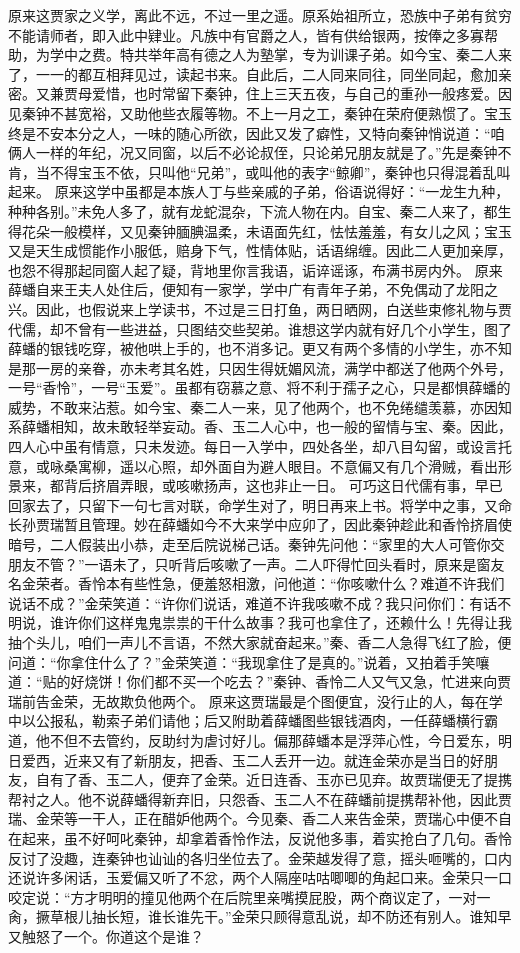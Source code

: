 \documentclass[12pt,oneside]{book}
\begin{document}
原来这贾家之义学，离此不远，不过一里之遥。原系始祖所立，恐族中子弟有贫穷不能请师者，即入此中肄业。凡族中有官爵之人，皆有供给银两，按俸之多寡帮助，为学中之费。特共举年高有德之人为塾掌，专为训课子弟。如今宝、秦二人来了，一一的都互相拜见过，读起书来。自此后，二人同来同往，同坐同起，愈加亲密。又兼贾母爱惜，也时常留下秦钟，住上三天五夜，与自己的重孙一般疼爱。因见秦钟不甚宽裕，又助他些衣履等物。不上一月之工，秦钟在荣府便熟惯了。宝玉终是不安本分之人，一味的随心所欲，因此又发了癖性，又特向秦钟悄说道：“咱俩人一样的年纪，况又同窗，以后不必论叔侄，只论弟兄朋友就是了。”先是秦钟不肯，当不得宝玉不依，只叫他“兄弟”，或叫他的表字“鲸卿”，秦钟也只得混着乱叫起来。
原来这学中虽都是本族人丁与些亲戚的子弟，俗语说得好：“一龙生九种，种种各别。”未免人多了，就有龙蛇混杂，下流人物在内。自宝、秦二人来了，都生得花朵一般模样，又见秦钟腼腆温柔，未语面先红，怯怯羞羞，有女儿之风；宝玉又是天生成惯能作小服低，赔身下气，性情体贴，话语绵缠。因此二人更加亲厚，也怨不得那起同窗人起了疑，背地里你言我语，诟谇谣诼，布满书房内外。
原来薛蟠自来王夫人处住后，便知有一家学，学中广有青年子弟，不免偶动了龙阳之兴。因此，也假说来上学读书，不过是三日打鱼，两日晒网，白送些束修礼物与贾代儒，却不曾有一些进益，只图结交些契弟。谁想这学内就有好几个小学生，图了薛蟠的银钱吃穿，被他哄上手的，也不消多记。更又有两个多情的小学生，亦不知是那一房的亲眷，亦未考其名姓，只因生得妩媚风流，满学中都送了他两个外号，一号“香怜”，一号“玉爱”。虽都有窃慕之意、将不利于孺子之心，只是都惧薛蟠的威势，不敢来沾惹。如今宝、秦二人一来，见了他两个，也不免绻缱羡慕，亦因知系薛蟠相知，故未敢轻举妄动。香、玉二人心中，也一般的留情与宝、秦。因此，四人心中虽有情意，只未发迹。每日一入学中，四处各坐，却八目勾留，或设言托意，或咏桑寓柳，遥以心照，却外面自为避人眼目。不意偏又有几个滑贼，看出形景来，都背后挤眉弄眼，或咳嗽扬声，这也非止一日。
可巧这日代儒有事，早已回家去了，只留下一句七言对联，命学生对了，明日再来上书。将学中之事，又命长孙贾瑞暂且管理。妙在薛蟠如今不大来学中应卯了，因此秦钟趁此和香怜挤眉使暗号，二人假装出小恭，走至后院说梯己话。秦钟先问他：“家里的大人可管你交朋友不管？”一语未了，只听背后咳嗽了一声。二人吓得忙回头看时，原来是窗友名金荣者。香怜本有些性急，便羞怒相激，问他道：“你咳嗽什么？难道不许我们说话不成？”金荣笑道：“许你们说话，难道不许我咳嗽不成？我只问你们：有话不明说，谁许你们这样鬼鬼祟祟的干什么故事？我可也拿住了，还赖什么！先得让我抽个头儿，咱们一声儿不言语，不然大家就奋起来。”秦、香二人急得飞红了脸，便问道：“你拿住什么了？”金荣笑道：“我现拿住了是真的。”说着，又拍着手笑嚷道：“贴的好烧饼！你们都不买一个吃去？”秦钟、香怜二人又气又急，忙进来向贾瑞前告金荣，无故欺负他两个。
原来这贾瑞最是个图便宜，没行止的人，每在学中以公报私，勒索子弟们请他；后又附助着薛蟠图些银钱酒肉，一任薛蟠横行霸道，他不但不去管约，反助纣为虐讨好儿。偏那薛蟠本是浮萍心性，今日爱东，明日爱西，近来又有了新朋友，把香、玉二人丢开一边。就连金荣亦是当日的好朋友，自有了香、玉二人，便弃了金荣。近日连香、玉亦已见弃。故贾瑞便无了提携帮衬之人。他不说薛蟠得新弃旧，只怨香、玉二人不在薛蟠前提携帮补他，因此贾瑞、金荣等一干人，正在醋妒他两个。今见秦、香二人来告金荣，贾瑞心中便不自在起来，虽不好呵叱秦钟，却拿着香怜作法，反说他多事，着实抢白了几句。香怜反讨了没趣，连秦钟也讪讪的各归坐位去了。金荣越发得了意，摇头咂嘴的，口内还说许多闲话，玉爱偏又听了不忿，两个人隔座咕咕唧唧的角起口来。金荣只一口咬定说：“方才明明的撞见他两个在后院里亲嘴摸屁股，两个商议定了，一对一肏，撅草根儿抽长短，谁长谁先干。”金荣只顾得意乱说，却不防还有别人。谁知早又触怒了一个。你道这个是谁？
\end{document}
